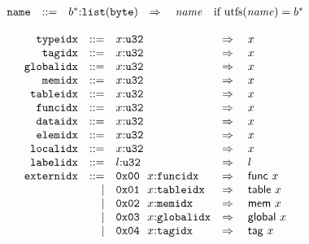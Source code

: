 $$
\begin{array}[t]{@{}lrrl@{}l@{}l@{}l@{}}
& {\mathtt{name}} & ::= & {b^\ast}{:}{\mathtt{list}}({\mathtt{byte}}) & \quad\Rightarrow\quad{} & {\mathit{name}} & \quad \mbox{if}~ {\mathrm{utf{\kern-0.1em\scriptstyle 8}}}({\mathit{name}}) = {b^\ast} \\
\end{array}
$$

\vspace{1ex}

$$
\begin{array}[t]{@{}lrrl@{}l@{}l@{}l@{}}
& {\mathtt{typeidx}} & ::= & x{:}{\mathtt{u32}} & \quad\Rightarrow\quad{} & x \\
& {\mathtt{tagidx}} & ::= & x{:}{\mathtt{u32}} & \quad\Rightarrow\quad{} & x \\
& {\mathtt{globalidx}} & ::= & x{:}{\mathtt{u32}} & \quad\Rightarrow\quad{} & x \\
& {\mathtt{memidx}} & ::= & x{:}{\mathtt{u32}} & \quad\Rightarrow\quad{} & x \\
& {\mathtt{tableidx}} & ::= & x{:}{\mathtt{u32}} & \quad\Rightarrow\quad{} & x \\
& {\mathtt{funcidx}} & ::= & x{:}{\mathtt{u32}} & \quad\Rightarrow\quad{} & x \\
& {\mathtt{dataidx}} & ::= & x{:}{\mathtt{u32}} & \quad\Rightarrow\quad{} & x \\
& {\mathtt{elemidx}} & ::= & x{:}{\mathtt{u32}} & \quad\Rightarrow\quad{} & x \\
& {\mathtt{localidx}} & ::= & x{:}{\mathtt{u32}} & \quad\Rightarrow\quad{} & x \\
& {\mathtt{labelidx}} & ::= & l{:}{\mathtt{u32}} & \quad\Rightarrow\quad{} & l \\
& {\mathtt{externidx}} & ::= & \mathtt{0x00}~~x{:}{\mathtt{funcidx}} & \quad\Rightarrow\quad{} & \mathsf{func}~x \\
& & | & \mathtt{0x01}~~x{:}{\mathtt{tableidx}} & \quad\Rightarrow\quad{} & \mathsf{table}~x \\
& & | & \mathtt{0x02}~~x{:}{\mathtt{memidx}} & \quad\Rightarrow\quad{} & \mathsf{mem}~x \\
& & | & \mathtt{0x03}~~x{:}{\mathtt{globalidx}} & \quad\Rightarrow\quad{} & \mathsf{global}~x \\
& & | & \mathtt{0x04}~~x{:}{\mathtt{tagidx}} & \quad\Rightarrow\quad{} & \mathsf{tag}~x \\
\end{array}
$$

